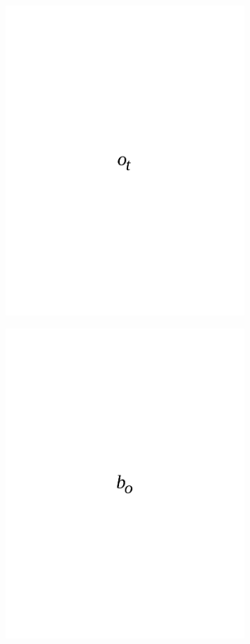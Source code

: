 \begin{figure}[H]
	\centering
	\includegraphics[width=0.8\textwidth]{media/ict/image61}
	\caption*{}
\end{figure}

\begin{figure}[H]
	\centering
	\includegraphics[width=0.8\textwidth]{media/ict/image62}
	\caption*{}
\end{figure}

